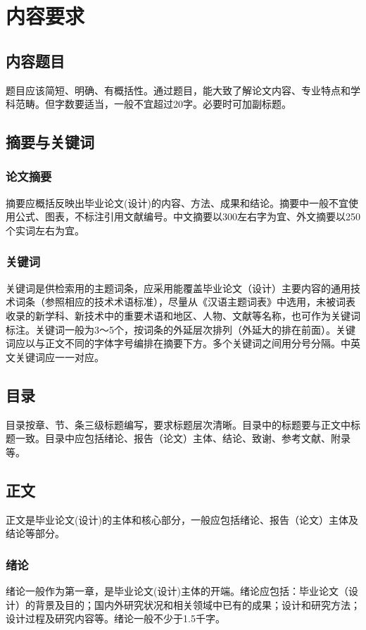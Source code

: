 \chapter{内容要求}
\vspace{7pt}
\section{内容题目}

题目应该简短、明确、有概括性。通过题目，能大致了解论文内容、专业特点和学科范畴。但字数要适当，一般不宜超过20字。必要时可加副标题。

\section{摘要与关键词}
\subsection{论文摘要}

摘要应概括反映出毕业论文(设计)的内容、方法、成果和结论。摘要中一般不宜使用公式、图表，不标注引用文献编号。中文摘要以300左右字为宜、外文摘要以250个实词左右为宜。

\subsection{关键词}
关键词是供检索用的主题词条，应采用能覆盖毕业论文（设计）主要内容的通用技术词条（参照相应的技术术语标准），尽量从《汉语主题词表》中选用，未被词表收录的新学科、新技术中的重要术语和地区、人物、文献等名称，也可作为关键词标注。关键词一般为3～5个，按词条的外延层次排列（外延大的排在前面）。关键词应以与正文不同的字体字号编排在摘要下方。多个关键词之间用分号分隔。中英文关键词应一一对应。

\section{目录}
目录按章、节、条三级标题编写，要求标题层次清晰。目录中的标题要与正文中标题一致。目录中应包括绪论、报告（论文）主体、结论、致谢、参考文献、附录等。
\section{正文}
正文是毕业论文(设计)的主体和核心部分，一般应包括绪论、报告（论文）主体及结论等部分。
\subsection{绪论}
绪论一般作为第一章，是毕业论文(设计)主体的开端。绪论应包括：毕业论文（设计）的背景及目的；国内外研究状况和相关领域中已有的成果；设计和研究方法；设计过程及研究内容等。绪论一般不少于1.5千字。
